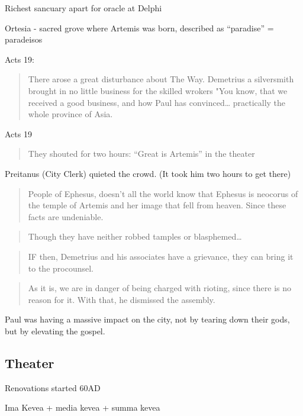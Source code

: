 \documentclass[
]{book}
\begin{document}
Richest sancuary apart for oracle at Delphi

Ortesia - sacred grove where Artemis was born, described as ``paradise'' = paradeisos

Acts 19:

\begin{quote}
There arose a great disturbance about The Way. Demetrius a silversmith brought in no little business for the skilled wrokers "You know, that we received a good business, and how Paul has convinced\ldots{} practically the whole province of Asia.
\end{quote}

Acts 19

\begin{quote}
They shouted for two hours: ``Great is Artemis'' in the theater
\end{quote}

Preitanus (City Clerk) quieted the crowd. (It took him two hours to get there)

\begin{quote}
People of Ephesus, doesn't all the world know that Ephesus is neocorus of the temple of Artemis and her image that fell from heaven. Since these facts are undeniable.
\end{quote}

\begin{quote}
Though they have neither robbed tamples or blasphemed\ldots{}
\end{quote}

\begin{quote}
IF then, Demetrius and his associates have a grievance, they can bring it to the procounsel.
\end{quote}

\begin{quote}
As it is, we are in danger of being charged with rioting, since there is no reason for it. With that, he dismissed the assembly.
\end{quote}

Paul was having a massive impact on the city, not by tearing down their gods, but by elevating the gospel.

\hypertarget{theater}{%
\subsection{Theater}\label{theater}}

Renovations started 60AD

Ima Kevea + media kevea + summa kevea
\end{document}
